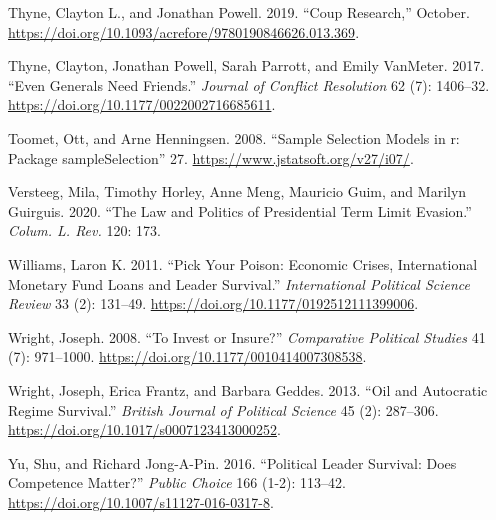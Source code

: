 \documentclass[
  12pt,
]{report}
\newlength{\cslhangindent}
\newenvironment{CSLReferences}[2] %
 {\begin{list}{}{%
  \setlength{\itemindent}{0pt}
  \setlength{\leftmargin}{0pt}
  \setlength{\parsep}{0pt}
  \ifodd #1
   \setlength{\leftmargin}{\cslhangindent}
   \setlength{\itemindent}{-1\cslhangindent}
  \fi
  \setlength{\itemsep}{#2\baselineskip}}}
 {\end{list}}
\begin{document}
\begin{CSLReferences}{1}{0}
Thyne, Clayton L., and Jonathan Powell. 2019. {``Coup Research,''}
October. \url{https://doi.org/10.1093/acrefore/9780190846626.013.369}.

Thyne, Clayton, Jonathan Powell, Sarah Parrott, and Emily VanMeter.
2017. {``Even Generals Need Friends.''} \emph{Journal of Conflict
Resolution} 62 (7): 1406--32.
\url{https://doi.org/10.1177/0022002716685611}.

Toomet, Ott, and Arne Henningsen. 2008. {``Sample Selection Models in
{\textbraceleft}r{\textbraceright}: Package
{\textbraceleft}sampleSelection{\textbraceright}''} 27.
\url{https://www.jstatsoft.org/v27/i07/}.

Versteeg, Mila, Timothy Horley, Anne Meng, Mauricio Guim, and Marilyn
Guirguis. 2020. {``The Law and Politics of Presidential Term Limit
Evasion.''} \emph{Colum. L. Rev.} 120: 173.

Williams, Laron K. 2011. {``Pick Your Poison: Economic Crises,
International Monetary Fund Loans and Leader Survival.''}
\emph{International Political Science Review} 33 (2): 131--49.
\url{https://doi.org/10.1177/0192512111399006}.

Wright, Joseph. 2008. {``To Invest or Insure?''} \emph{Comparative
Political Studies} 41 (7): 971--1000.
\url{https://doi.org/10.1177/0010414007308538}.

Wright, Joseph, Erica Frantz, and Barbara Geddes. 2013. {``Oil and
Autocratic Regime Survival.''} \emph{British Journal of Political
Science} 45 (2): 287--306.
\url{https://doi.org/10.1017/s0007123413000252}.

Yu, Shu, and Richard Jong-A-Pin. 2016. {``Political Leader Survival:
Does Competence Matter?''} \emph{Public Choice} 166 (1-2): 113--42.
\url{https://doi.org/10.1007/s11127-016-0317-8}.

\end{CSLReferences}
\end{document}
